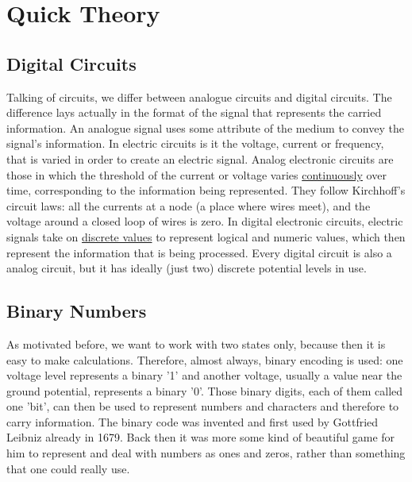 

\section{Quick Theory}
\subsection{Digital Circuits}
Talking of circuits, we differ between analogue circuits and digital circuits. The difference lays actually in the format of the signal that represents the carried information. \newline
An analogue signal uses some attribute of the medium to convey the signal's information. In electric circuits is it the voltage, current or frequency, that is varied in order to create an electric signal. Analog electronic circuits are those in which the threshold of the current or voltage varies \underline{continuously} over time, corresponding to the information being represented. They follow Kirchhoff's circuit laws: all the currents at a node (a place where wires meet), and the voltage around a closed loop of wires is zero. \newline
In digital electronic circuits, electric signals take on \underline{discrete values} to represent logical and numeric values, which then represent the information that is being processed. Every digital circuit is also a analog circuit, but it has ideally (just two) discrete potential levels in use. 

\subsection{Binary Numbers}
As motivated before, we want to work with two states only, because then it is easy to make calculations. Therefore, almost always, binary encoding is used: one voltage level represents a binary '1' and another voltage, usually a value near the ground potential, represents a binary '0'. Those binary digits, each of them called one 'bit', can then be used to represent numbers and characters and therefore to carry information. The binary code was invented and first used by Gottfried Leibniz already in 1679. Back then it was more some kind of beautiful game for him to represent and deal with numbers as ones and zeros, rather than something that one could really use.

